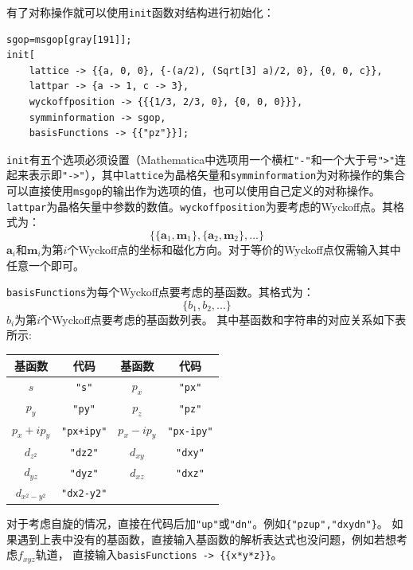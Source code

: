 \documentclass[titlepage,a4paper,12pt,AutoFakeBold]{article}
\begin{document}
有了对称操作就可以使用\lstinline|init|函数对结构进行初始化：
\begin{lstlisting}
sgop=msgop[gray[191]];
init[
	lattice -> {{a, 0, 0}, {-(a/2), (Sqrt[3] a)/2, 0}, {0, 0, c}},
	lattpar -> {a -> 1, c -> 3},
	wyckoffposition -> {{{1/3, 2/3, 0}, {0, 0, 0}}},
	symminformation -> sgop,
	basisFunctions -> {{"pz"}}];
\end{lstlisting}	
\lstinline|init|有五个选项必须设置（Mathematica中选项用一个横杠\lstinline|"-"|和一个大于号\lstinline|">"|连起来表示即\lstinline|"->"|），其中\lstinline|lattice|为晶格矢量和\lstinline|symminformation|为对称操作的集合可以直接使用\lstinline|msgop|的输出作为选项的值，也可以使用自己定义的对称操作。\lstinline|lattpar|为晶格矢量中参数的数值。\lstinline|wyckoffposition|为要考虑的Wyckoff点。其格式为：
\[
\{\{\boldsymbol{a}_{1},\boldsymbol{m}_{1}\},\{\boldsymbol{a}_{2},\boldsymbol{m}_{2}\},...\}
\]
$\boldsymbol{a}_{i}$和$\boldsymbol{m}_{i}$为第$i$个Wyckoff点的坐标和磁化方向。对于等价的Wyckoff点仅需输入其中任意一个即可。

\lstinline|basisFunctions|为每个Wyckoff点要考虑的基函数。其格式为：
\[
\{b_{1},b_{2},...\}
\]
$b_{i}$为第$i$个Wyckoff点要考虑的基函数列表。
其中基函数和字符串的对应关系如下表所示:
\begin{table}[H]
	\centering 
	\label{tab:bf} %
	\begin{tabular}{cc|cc}
		\hline 
		基函数  & 代码  & 基函数  & 代码 \tabularnewline
		\hline 
		$s$  & \lstinline!"s"! & $p_{x}$  & \lstinline!"px"! \tabularnewline
		\hline 
		$p_{y}$  & \lstinline!"py"! & $p_{z}$  & \lstinline!"pz"! \tabularnewline
		\hline 
		$p_{x}+ip_{y}$  & \lstinline!"px+ipy"! & $p_{x}-ip_{y}$  & \lstinline!"px-ipy"! \tabularnewline
		\hline 
		$d_{z^{2}}$  & \lstinline!"dz2"! & $d_{xy}$  & \lstinline!"dxy"! \tabularnewline
		\hline 
		$d_{yz}$  & \lstinline!"dyz"! & $d_{xz}$  & \lstinline!"dxz"! \tabularnewline
		\hline 
		$d_{x^{2}-y^{2}}$  & \lstinline!"dx2-y2"!  &  & \tabularnewline
		\hline 
	\end{tabular}
\end{table}
\noindent 对于考虑自旋的情况，直接在代码后加\lstinline!"up"!或\lstinline!"dn"!。例如\lstinline!{"pzup","dxydn"}!。
如果遇到上表中没有的基函数，直接输入基函数的解析表达式也没问题，例如若想考虑$f_{xyz}$轨道，
直接输入\lstinline!basisFunctions -> {{x*y*z}}!。
\end{document}
